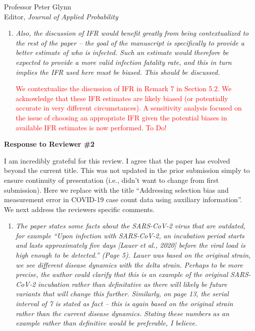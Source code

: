 \documentclass[11pt]{letter} %
\begin{document}
\begin{letter}{Professor
	Peter Glynn\\
	Editor, {\em Journal of Applied Probability}}
\begin{enumerate}
\begin{enumerate}
	\textcolor{red}{See our answer to Question 12a above.  In Section 5.2, we now clarify hwo the the infection-fatality rate is used in our model. Similar to Johndrow (2021), the model only uses COVID-19 related deaths.  Deaths to non-COVID causes are not directly modeled but would appear as part of the R component in the global SEIR model.}
	\vspace{5mm}
	\item {\it Also, the discussion of IFR would benefit greatly from being contextualized to the rest of the paper – the goal of the manuscript is specifically to provide a better estimate of who is infected. Such an estimate would therefore be expected to provide a more valid infection fatality rate, and this in turn implies the IFR used here must be biased. This should be discussed.}
	\vspace{5mm}

    \textcolor{red}{We contextualize the discussion of IFR in Remark 7 in Section 5.2. We acknowledge that these IFR estimates are likely biased (or potentially accurate in very different circumstances).  A sensitivity analysis focused on the issue of choosing an appropriate IFR given the potential biases in available IFR estimates is now performed.}
    \textcolor{red}{To Do!}
	\vspace{5mm}
\end{enumerate}
\end{enumerate}
\newpage

{\bf Response to Reviewer \#2}

I am incredibly grateful for this review.  I agree that the paper has evolved beyond the current title.  This was not updated in the prior submission simply to ensure continuity of presentation (i.e., didn't want to change from first submission).  Here we replace with the title ``Addressing selection bias and measurement error in COVID-19 case count data using auxiliary information''.  We next address the reviewers specific comments.

\begin{enumerate}
\item {\it The paper states some facts about the SARS-CoV-2 virus that are outdated, for example “Upon infection with SARS-CoV-2, an incubation period starts and lasts approximately five days [Lauer et al., 2020] before the viral load is high enough to be detected.” (Page 5). Lauer was based on the original
strain, we see different disease dynamics with the delta strain. Perhaps to be more precise, the author could clarify that this is an example of the original SARS-CoV-2 incubation rather than definitative as there will likely be future variants that will change this further. Similarly, on page 13, the serial
interval of 7 is stated as fact – this is again based on the original strain rather than the current disease dynamics. Stating these numbers as an example rather than definitive would be preferable, I believe.}
\vspace{5mm}


\end{enumerate}
\end{letter}
\end{document}
